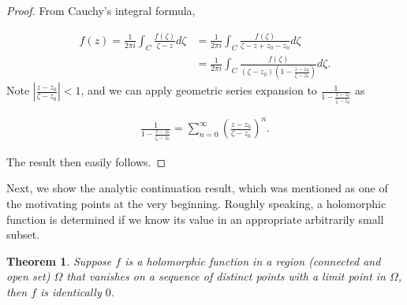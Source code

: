 \documentclass{article}
\newtheorem{theorem}{Theorem}
\begin{document}
\begin{proof}
From Cauchy's integral formula, 

\begin{equation*}
\begin{aligned}
f(z)=\frac{1}{2\pi i}\int_C\frac{f(\zeta)}{\zeta-z}d\zeta&=\frac{1}{2\pi i}\int_C\frac{f(\zeta)}{\zeta-z+z_0-z_0}d\zeta \\
&=\frac{1}{2\pi i}\int_C\frac{f(\zeta)}{(\zeta-z_0)(1-\frac{z-z_0}{\zeta-z_0})}d\zeta.
\end{aligned}
\end{equation*}
Note $|\frac{z-z_0}{\zeta-z_0}|<1$, and we can apply geometric series expansion to $\frac{1}{1-\frac{z-z_0}{\zeta-z_0}}$ as 

\begin{equation*}
\begin{aligned}
\frac{1}{1-\frac{z-z_0}{\zeta-z_0}} = \sum_{n=0}^\infty (\frac{z-z_0}{\zeta-z_0})^n.
\end{aligned}
\end{equation*}

The result then easily follows.
\end{proof}

Next, we show the analytic continuation result, which was mentioned as one of the motivating points at the very beginning. Roughly speaking, a holomorphic function is determined if we know its value in an appropriate arbitrarily small subset. 

\begin{theorem}
Suppose $f$ is a holomorphic function in a region (connected and open set) $\Omega$ that vanishes on a sequence of distinct points with a limit point in $\Omega$, then $f$ is identically $0$.
\end{theorem}
\end{document}
